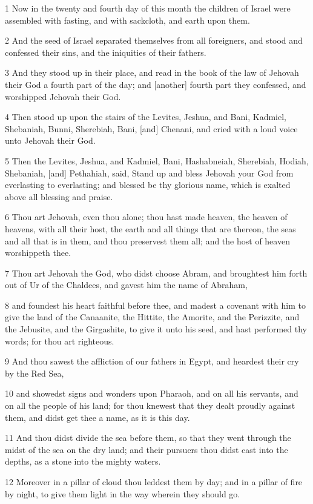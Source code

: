 \par 1 Now in the twenty and fourth day of this month the children of Israel were assembled with fasting, and with sackcloth, and earth upon them.
\par 2 And the seed of Israel separated themselves from all foreigners, and stood and confessed their sins, and the iniquities of their fathers.
\par 3 And they stood up in their place, and read in the book of the law of Jehovah their God a fourth part of the day; and [another] fourth part they confessed, and worshipped Jehovah their God.
\par 4 Then stood up upon the stairs of the Levites, Jeshua, and Bani, Kadmiel, Shebaniah, Bunni, Sherebiah, Bani, [and] Chenani, and cried with a loud voice unto Jehovah their God.
\par 5 Then the Levites, Jeshua, and Kadmiel, Bani, Hashabneiah, Sherebiah, Hodiah, Shebaniah, [and] Pethahiah, said, Stand up and bless Jehovah your God from everlasting to everlasting; and blessed be thy glorious name, which is exalted above all blessing and praise.
\par 6 Thou art Jehovah, even thou alone; thou hast made heaven, the heaven of heavens, with all their host, the earth and all things that are thereon, the seas and all that is in them, and thou preservest them all; and the host of heaven worshippeth thee.
\par 7 Thou art Jehovah the God, who didst choose Abram, and broughtest him forth out of Ur of the Chaldees, and gavest him the name of Abraham,
\par 8 and foundest his heart faithful before thee, and madest a covenant with him to give the land of the Canaanite, the Hittite, the Amorite, and the Perizzite, and the Jebusite, and the Girgashite, to give it unto his seed, and hast performed thy words; for thou art righteous.
\par 9 And thou sawest the affliction of our fathers in Egypt, and heardest their cry by the Red Sea,
\par 10 and showedst signs and wonders upon Pharaoh, and on all his servants, and on all the people of his land; for thou knewest that they dealt proudly against them, and didst get thee a name, as it is this day.
\par 11 And thou didst divide the sea before them, so that they went through the midst of the sea on the dry land; and their pursuers thou didst cast into the depths, as a stone into the mighty waters.
\par 12 Moreover in a pillar of cloud thou leddest them by day; and in a pillar of fire by night, to give them light in the way wherein they should go.
